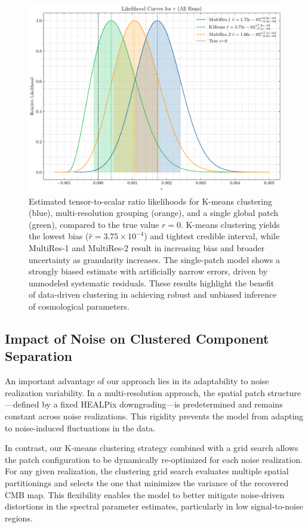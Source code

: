 \documentclass[%
 reprint,
bibnotes,
 amsmath,amssymb,
 aps,
floatfix, 
]{revtex4-2}
\begin{document}
\vspace{-1em}

\begin{figure}[!ht]
    \centering
    \includegraphics[width=0.55\linewidth]{figures/r_likelihood_distribution.pdf}
    \caption{
    Estimated tensor-to-scalar ratio likelihoods for K-means clustering (blue), multi-resolution grouping (orange), and a single global patch (green), compared to the true value \( r = 0 \). 
    K-means clustering yields the lowest bias (\( \hat{r} = 3.75 \times 10^{-4} \)) and tightest credible interval, while MultiRes-1 and MultiRes-2 result in increasing bias and broader uncertainty as granularity increases. 
    The single-patch model shows a strongly biased estimate with artificially narrow errors, driven by unmodeled systematic residuals. 
    These results highlight the benefit of data-driven clustering in achieving robust and unbiased inference of cosmological parameters.
    }
    \label{fig:r_likelihood_distribution}
\end{figure}


\subsection{Impact of Noise on Clustered Component Separation}
\label{subsec:noise_impact}

An important advantage of our approach lies in its adaptability to noise realization variability. In a multi-resolution approach, the spatial patch structure—defined by a fixed HEALPix downgrading—is predetermined and remains constant across noise realizations. This rigidity prevents the model from adapting to noise-induced fluctuations in the data.

In contrast, our K-means clustering strategy combined with a grid search allows the patch configuration to be dynamically re-optimized for each noise realization. For any given realization, the clustering grid search evaluates multiple spatial partitionings and selects the one that minimizes the variance of the recovered CMB map. This flexibility enables the model to better mitigate noise-driven distortions in the spectral parameter estimates, particularly in low signal-to-noise regions.
\end{document}
